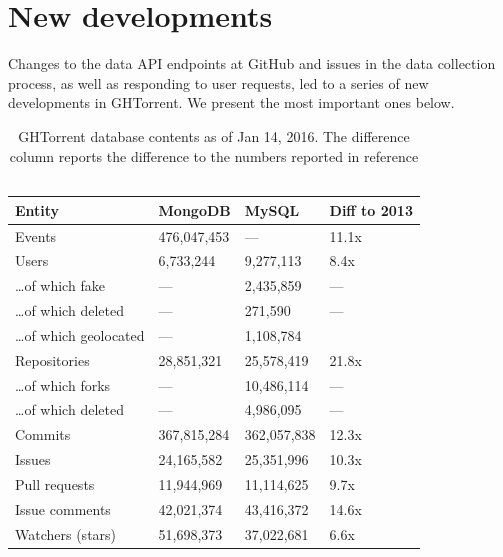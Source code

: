 \documentclass{sig-alternate}
\begin{document}
\section{New developments}

Changes to the data API endpoints at GitHub and issues in the data collection
process, as well as responding to user requests, led to a series of new
developments in GHTorrent. We present the most important ones below.

\begin{table}
  \centering
  \begin{small}
  \label{tab:datasetsize}
  \begin{tabular}{llll}
    \hline
    \bfseries{Entity} & \bfseries{MongoDB} & \bfseries{MySQL} & \bfseries{Diff to 2013} \\
    \hline
      Events                     & 476,047,453 & ---           & 11.1x\\
      Users                      & 6,733,244   & 9,277,113     & 8.4x \\
      \ldots of which fake       & ---         & 2,435,859     & ---\\
      \ldots of which deleted    & ---         & 271,590       & ---\\
      \ldots of which geolocated & ---         & 1,108,784     & \\
      Repositories               & 28,851,321  & 25,578,419    & 21.8x\\
      \ldots of which forks      & ---         & 10,486,114    & --- \\
      \ldots of which deleted    & ---         & 4,986,095     & ---\\
      Commits                    & 367,815,284 & 362,057,838   & 12.3x \\
      Issues                     & 24,165,582  & 25,351,996    & 10.3x \\
      Pull requests              & 11,944,969  & 11,114,625    & 9.7x \\
      Issue comments             & 42,021,374  & 43,416,372    & 14.6x\\
      Watchers (stars)           & 51,698,373  & 37,022,681    & 6.6x\\
      \hline
    \end{tabular}

    \caption{GHTorrent database contents as of Jan 14, 2016. The difference column reports the difference to the numbers reported in reference ~\cite{Gousi13}}
  \end{small}
  \label{tab:stats}
\end{table}
\end{document}
